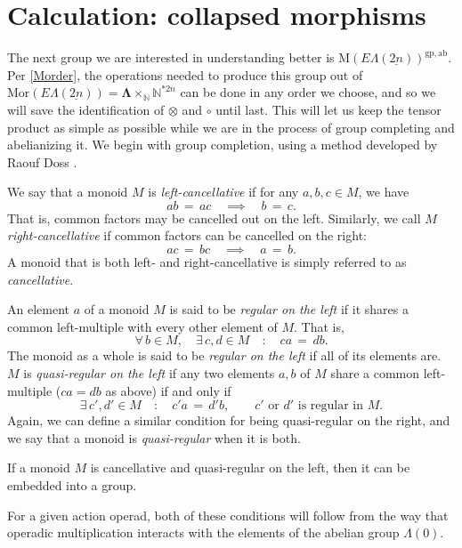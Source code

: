 \documentclass{amsbook} %
\newcommand{\ML}{\mathbf{\Lambda}}
\newcommand{\ELnn}{E\Lambda(\underline{2n})}
\numberwithin{section}{chapter}
\begin{document}
\section{Calculation: collapsed morphisms}

The next group we are interested in understanding better is $\mathrm{M}(\ELnn)^{\mathrm{gp},\mathrm{ab}}$. Per \cref{Morder}, the operations needed to produce this group out of $\mathrm{Mor}(\ELnn) = \ML \times_{\mathbb{N}} \mathbb{N}^{\ast 2n}$ can be done in any order we choose, and so we will save the identification of $\otimes$ and $\circ$ until last. This will let us keep the tensor product as simple as possible while we are in the process of group completing and abelianizing it. We begin with group completion, using a method developed by Raouf Doss \cite{doss-imm}.

\begin{Defi} We say that a monoid $M$ is \emph{left-cancellative} if for any $a, b, c \in M$, we have
\[ ab \, = \, ac \quad \implies \quad b \, = \, c. \]
That is, common factors may be cancelled out on the left. Similarly, we call $M$ \emph{right-cancellative} if common factors can be cancelled on the right:
\[ ac \, = \, bc \quad \implies \quad a \, = \, b. \]
A monoid that is both left- and right-cancellative is simply referred to as \emph{cancellative}.
\end{Defi}

\begin{Defi} An element $a$ of a monoid $M$ is said to be \emph{regular on the left} if it shares a common left-multiple with every other element of $M$. That is,
\[ \forall \, b \in M, \quad \exists \, c, d \in M \quad : \quad ca \, = \, db. \]
The monoid as a whole is said to be \emph{regular on the left} if all of its elements are.
 $M$ is \emph{quasi-regular on the left} if any two elements $a,b$ of $M$ share a common left-multiple ($ca = db$ as above) if and only if
\[ \exists \, c', d' \in M \quad : \quad c'a \, = \, d'b, \quad \quad \text{$c'$ or $d'$ is regular in $M$.} \]
Again, we can define a similar condition for being quasi-regular on the right, and we say that a monoid is \emph{quasi-regular} when it is both.
\end{Defi}

\begin{prop} If a monoid $M$ is cancellative and quasi-regular on the left, then it can be embedded into a group.
\end{prop}

For a given action operad, both of these conditions will follow from the way that operadic multiplication interacts with the elements of the abelian group $\Lambda(0)$.
\end{document}
